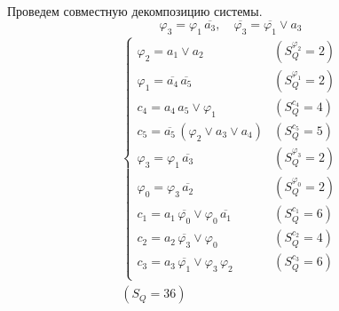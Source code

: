 \documentclass{article}
\begin{document}
\noindent\begin{minipage}{\textwidth}
Проведем совместную декомпозицию системы. \[\varphi_{3} = \varphi_{1}\,\overline{a_3}, \quad \overline{\varphi_{3}} = \overline{\varphi_{1}} \lor a_3\]
\[\begin{matrix}
    \begin{cases}
        \varphi_{2} = a_1 \lor a_2 & (S_Q^{\varphi_{2}} = 2) \\
        \varphi_{1} = \overline{a_4}\,\overline{a_5} & (S_Q^{\varphi_{1}} = 2) \\
        c_4 = a_4\,a_5 \lor \varphi_{1} & (S_Q^{c_4} = 4) \\
        c_5 = \overline{a_5}\,\left(\varphi_{2} \lor a_3 \lor a_4\right) & (S_Q^{c_5} = 5) \\
        \varphi_{3} = \varphi_{1}\,\overline{a_3} & (S_Q^{\varphi_{3}} = 2) \\
        \varphi_{0} = \varphi_{3}\,\overline{a_2} & (S_Q^{\varphi_{0}} = 2) \\
        c_1 = a_1\,\overline{\varphi_{0}} \lor \varphi_{0}\,\overline{a_1} & (S_Q^{c_1} = 6) \\
        c_2 = a_2\,\overline{\varphi_{3}} \lor \varphi_{0} & (S_Q^{c_2} = 4) \\
        c_3 = a_3\,\overline{\varphi_{1}} \lor \varphi_{3}\,\varphi_{2} & (S_Q^{c_3} = 6) \\
    \end{cases} \\ (S_Q = 36)
\end{matrix}\] \\ \phantom{0}
\end{minipage}
\clearpage
\end{document}
